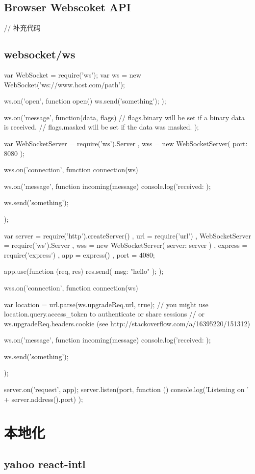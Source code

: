 \subsection{Browser Webscoket API}

\begin{JavaScript}

// 补充代码

\end{JavaScript}


\subsection{websocket/ws}

\begin{JavaScript}[client]

var WebSocket = require('ws');
var ws = new WebSocket('ws://www.host.com/path');

ws.on('open', function open() {
  ws.send('something');
});

ws.on('message', function(data, flags) {
  // flags.binary will be set if a binary data is received.
  // flags.masked will be set if the data was masked.
});

\end{JavaScript}


\begin{JavaScript}[server]
var WebSocketServer = require('ws').Server
  , wss = new WebSocketServer({ port: 8080 });

wss.on('connection', function connection(ws) {
  ws.on('message', function incoming(message) {
    console.log('received: %
  });

  ws.send('something');
});
\end{JavaScript}

\begin{JavaScript}[express]
var server = require('http').createServer()
  , url = require('url')
  , WebSocketServer = require('ws').Server
  , wss = new WebSocketServer({ server: server })
  , express = require('express')
  , app = express()
  , port = 4080;

app.use(function (req, res) {
  res.send({ msg: "hello" });
});

wss.on('connection', function connection(ws) {
  var location = url.parse(ws.upgradeReq.url, true);
  // you might use location.query.access_token to authenticate or share sessions
  // or ws.upgradeReq.headers.cookie (see http://stackoverflow.com/a/16395220/151312)

  ws.on('message', function incoming(message) {
    console.log('received: %
  });

  ws.send('something');
});

server.on('request', app);
server.listen(port, function () { console.log('Listening on ' + server.address().port) });
\end{JavaScript}


\section{本地化}

\subsection{yahoo react-intl}